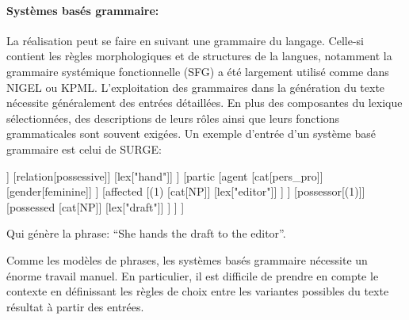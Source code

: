 	\paragraph{Systèmes basés grammaire:} La réalisation peut se faire en suivant une grammaire du langage. Celle-si contient les règles morphologiques et de structures de la langues, notamment la grammaire systémique fonctionnelle (SFG)\cite{Halliday2004} a été largement utilisé comme dans NIGEL\cite{Mann1983} ou KPML\cite{Bateman1997}. L’exploitation des grammaires dans la génération du texte nécessite généralement des entrées détaillées. En plus des composantes du lexique sélectionnées, des descriptions de leurs rôles ainsi que leurs fonctions grammaticales sont souvent exigées. Un exemple d’entrée d’un système basé grammaire est celui de SURGE\cite{Elhadad1996}:
	\begin{center}
		\begin{forest} [
			[cat:clause]
			[process
			[type[composite]]
			[relation[possessive]]
			[lex[\color{red}"hand"]]
			]
			[partic
			[agent
			[cat[pers\_pro]]
			[gender[feminine]]
			]
			[affected
			[(1)
			[cat[NP]]
			[lex[\color{red}"editor"]]
			]
			]
			[possessor[(1)]]
			[possessed
			[cat[NP]]
			[lex[\color{red}"draft"]]
			]
			]
			]
		\end{forest}
	\end{center}
	Qui génère la phrase: “She hands the draft to the editor”.\newline

Comme les modèles de phrases, les systèmes basés grammaire nécessite un énorme travail manuel. En particulier, il est difficile de prendre en compte le contexte en définissant les règles de choix entre les variantes possibles du texte résultat à partir des entrées\cite{Gatt2018}.

